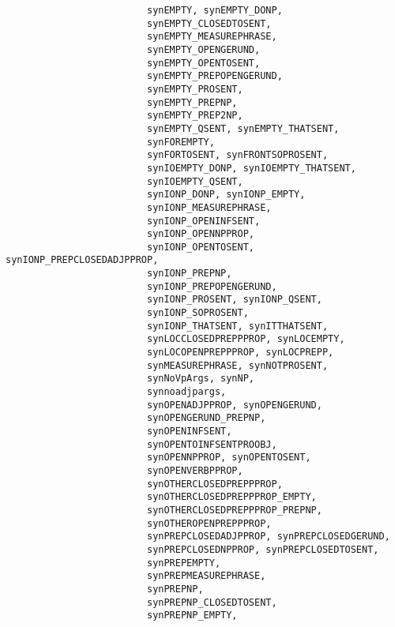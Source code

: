\begin{verbatim}
                         synEMPTY, synEMPTY_DONP, 
                         synEMPTY_CLOSEDTOSENT,            
                         synEMPTY_MEASUREPHRASE, 
                         synEMPTY_OPENGERUND,              
                         synEMPTY_OPENTOSENT, 
                         synEMPTY_PREPOPENGERUND,          
                         synEMPTY_PROSENT,                 
                         synEMPTY_PREPNP,                  
                         synEMPTY_PREP2NP,                 
                         synEMPTY_QSENT, synEMPTY_THATSENT, 
                         synFOREMPTY,                      
                         synFORTOSENT, synFRONTSOPROSENT,  
                         synIOEMPTY_DONP, synIOEMPTY_THATSENT,
                         synIOEMPTY_QSENT,                    
                         synIONP_DONP, synIONP_EMPTY,         
                         synIONP_MEASUREPHRASE, 
                         synIONP_OPENINFSENT,                 
                         synIONP_OPENNPPROP,                  
                         synIONP_OPENTOSENT, synIONP_PREPCLOSEDADJPPROP, 
                         synIONP_PREPNP, 
                         synIONP_PREPOPENGERUND,              
                         synIONP_PROSENT, synIONP_QSENT, 
                         synIONP_SOPROSENT, 
                         synIONP_THATSENT, synITTHATSENT, 
                         synLOCCLOSEDPREPPPROP, synLOCEMPTY,  
                         synLOCOPENPREPPPROP, synLOCPREPP,    
                         synMEASUREPHRASE, synNOTPROSENT,     
                         synNoVpArgs, synNP, 
                         synnoadjpargs,                       
                         synOPENADJPPROP, synOPENGERUND, 
                         synOPENGERUND_PREPNP,                
                         synOPENINFSENT,
                         synOPENTOINFSENTPROOBJ,         
                         synOPENNPPROP, synOPENTOSENT,   
                         synOPENVERBPPROP,
                         synOTHERCLOSEDPREPPPROP, 
                         synOTHERCLOSEDPREPPPROP_EMPTY,  
                         synOTHERCLOSEDPREPPPROP_PREPNP, 
                         synOTHEROPENPREPPPROP,
                         synPREPCLOSEDADJPPROP, synPREPCLOSEDGERUND, 
                         synPREPCLOSEDNPPROP, synPREPCLOSEDTOSENT, 
                         synPREPEMPTY,                   
                         synPREPMEASUREPHRASE,           
                         synPREPNP, 
                         synPREPNP_CLOSEDTOSENT,         
                         synPREPNP_EMPTY,                

\end{verbatim}
